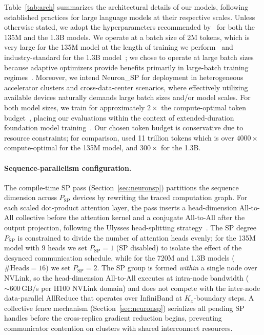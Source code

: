 \documentclass{article}
\begin{document}
Table~\ref{tab:arch} summarizes the architectural details of our models, following established practices for large
language models at their respective scales. Unless otherwise stated, we adopt the hyperparameters
recommended by~\citet{allal2025smollm2} for both the 135M and the 1.3B models. We operate at a
batch size of 2M tokens, which is very large for the 135M model at the length of training we
perform~\citep{zhang2025critical} and industry-standard for the 1.3B model~\citep{touvron2023llama2};
we chose to operate at large batch sizes because adaptive optimizers provide benefits primarily in
large-batch training regimes~\citep{kunstner2023noise}.
Moreover, we intend Neuron\_SP for deployment in heterogeneous accelerator clusters and
cross-data-center scenarios, where effectively utilizing available devices naturally demands large
batch sizes and/or model scales.
For both model sizes, we train for approximately $2\times$ the compute-optimal token
budget~\citep{hoffmann2022training}, placing our evaluations within the context of extended-duration
foundation model training~\citep{allal2025smollm2}. Our chosen token budget is conservative due to
resource constraints; for comparison, \citet{allal2025smollm2} used 11 trillion tokens which is
over $4000\times$ compute-optimal for the 135M model, and $300\times$ for the 1.3B.

\paragraph{Sequence-parallelism configuration.}
The compile-time SP pass (Section~\ref{sec:neuronsp}) partitions the sequence dimension across
$P_{\text{SP}}$ devices by rewriting the traced computation graph. For each scaled dot-product
attention layer, the pass inserts a head-dimension All-to-All collective before the attention
kernel and a conjugate All-to-All after the output projection, following the Ulysses
head-splitting strategy~\citep{jacobs2023deepspeed,fang2024unified}.
The SP degree $P_{\text{SP}}$ is constrained to divide the number of attention heads evenly;
for the 135M model with 9 heads we set $P_{\text{SP}} = 1$ (SP disabled) to isolate the
effect of the desynced communication schedule, while for the 720M and 1.3B models
($\text{\#Heads} = 16$) we set $P_{\text{SP}} = 2$.
The SP group is formed \emph{within} a single node over NVLink, so the head-dimension
All-to-All executes at intra-node bandwidth (${\sim}600$\,GB/s per H100 NVLink domain)
and does not compete with the inter-node data-parallel AllReduce that operates over
InfiniBand at $K_x$-boundary steps.
A collective fence mechanism (Section~\ref{sec:neuronsp}) serializes all pending SP handles
before the cross-replica gradient reduction begins, preventing communicator contention on
clusters with shared interconnect resources.
\end{document}
